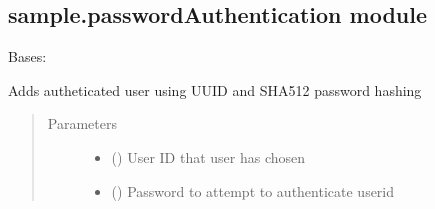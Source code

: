 \documentclass[letterpaper,10pt,english]{sphinxmanual}
\begin{document}
\subsection{sample.passwordAuthentication module}
\label{\detokenize{sample:sample-passwordauthentication-module}}\label{\detokenize{sample:module-sample.passwordAuthentication}}

\begin{fulllineitems}
\label{\detokenize{sample:sample.passwordAuthentication.Password}}
Bases: 

\begin{fulllineitems}
\label{\detokenize{sample:sample.passwordAuthentication.Password.addAutheticatedUser}}
Adds autheticated user using UUID and SHA512 password hashing
\begin{quote}\begin{description}
\item[{Parameters}] \leavevmode\begin{itemize}
\item {} 
 () \textendash{} User ID that user has chosen

\item {} 
 () \textendash{} Password to attempt to authenticate userid

\end{itemize}

\end{description}\end{quote}

\end{fulllineitems}



\end{fulllineitems}
\end{document}
